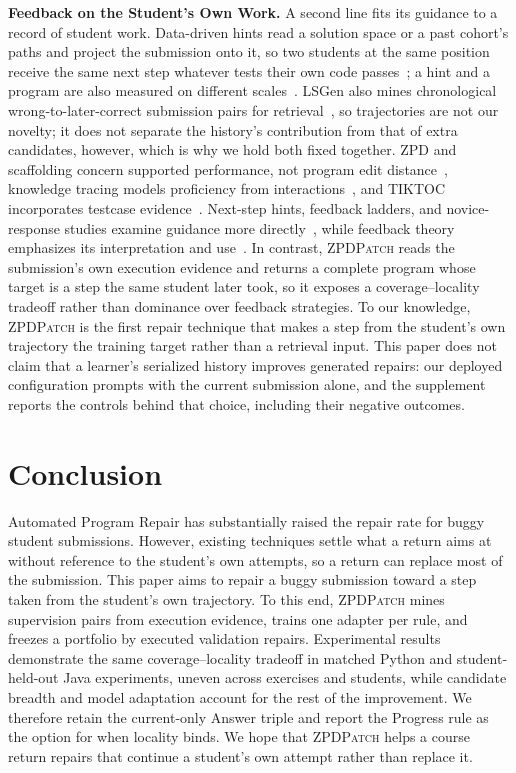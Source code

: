 \documentclass[10pt,conference]{IEEEtran}
\begin{document}
\noindent\textbf{Feedback on the Student's Own Work.} A second line fits its guidance to a record of student work. Data-driven hints read a solution space or a past cohort's paths and project the submission onto it, so two students at the same position receive the same next step whatever tests their own code passes~\cite{rivers2017data,price2017isnap,roest2024next}; a hint and a program are also measured on different scales~\cite{yi2017feasibility,koutcheme2024benchmarking,keuning2018systematic}. LSGen also mines chronological wrong-to-later-correct submission pairs for retrieval~\cite{dai2026learner}, so trajectories are not our novelty; it does not separate the history's contribution from that of extra candidates, however, which is why we hold both fixed together. ZPD and scaffolding concern supported performance, not program edit distance~\cite{cole1978mind,murray2002toward,chounta2017grey,schulze2024beyond}, knowledge tracing models proficiency from interactions~\cite{corbett1994knowledge,piech2015deep,ghosh2020context}, and TIKTOC incorporates testcase evidence~\cite{duan2024tiktoc}. Next-step hints, feedback ladders, and novice-response studies examine guidance more directly~\cite{roest2024next,heickal2024generating,xiao2024exploring}, while feedback theory emphasizes its interpretation and use~\cite{narciss2008feedback,hattie2007power,shute2008focus,aleven2000limitations}. In contrast, \textsc{ZPDPatch} reads the submission's own execution evidence and returns a complete program whose target is a step the same student later took, so it exposes a coverage--locality tradeoff rather than dominance over feedback strategies. To our knowledge, \textsc{ZPDPatch} is the first repair technique that makes a step from the student's own trajectory the training target rather than a retrieval input. This paper does not claim that a learner's serialized history improves generated repairs: our deployed configuration prompts with the current submission alone, and the supplement reports the controls behind that choice, including their negative outcomes.

\section{Conclusion}
\label{sec:conclusion}
Automated Program Repair has substantially raised the repair rate for buggy student submissions. However, existing techniques settle what a return aims at without reference to the student's own attempts, so a return can replace most of the submission. This paper aims to repair a buggy submission toward a step taken from the student's own trajectory. To this end, \textsc{ZPDPatch} mines supervision pairs from execution evidence, trains one adapter per rule, and freezes a portfolio by executed validation repairs. Experimental results demonstrate the same coverage--locality tradeoff in matched Python and student-held-out Java experiments, uneven across exercises and students, while candidate breadth and model adaptation account for the rest of the improvement. We therefore retain the current-only Answer triple and report the Progress rule as the option for when locality binds. We hope that \textsc{ZPDPatch} helps a course return repairs that continue a student's own attempt rather than replace it.
\end{document}
